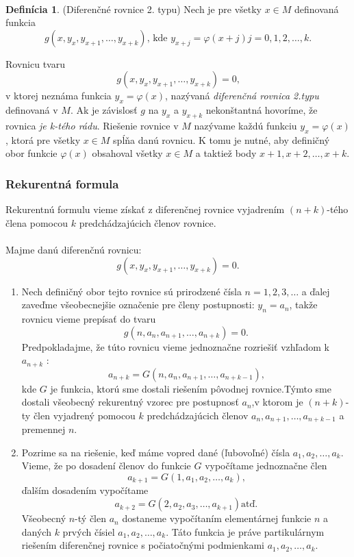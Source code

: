 \documentclass[a4paper,10pt]{article}
\theoremstyle{plain}
\theoremstyle{definition}
\newtheorem{defin}[thm]{Definícia}
\begin{document}
\paragraph{}
\begin{defin}
(Diferenčné rovnice 2. typu)
Nech je pre všetky $x \in M$
definovaná funkcia
$$g(x, y_{x}, y_{x+1}, \ldots, y_{x+k})\text{, kde }y_{x+j} = \varphi(x + j) j = 0, 1, 2, \ldots, k\text{.}$$
\end{defin}

Rovnicu tvaru
$$g(x, y_{x}, y_{x+1}, \ldots, y_{x+k}) = 0\text{,}$$
v ktorej neznáma funkcia $y_{x} = \varphi(x)$, nazývaná \textit{diferenčná rovnica 2.typu}
definovaná v $M$. Ak je závislosť $g$ na $y_{x}$ a $y_{x+k}$ nekonštantná hovoríme,
že rovnica \textit{je k-tého rádu}. Riešenie rovnice v $M$ nazývame každú funkciu
$y_{x} = \varphi(x)$, ktorá pre všetky $x \in M$  spĺňa danú rovnicu. K tomu je nutné,
aby definičný obor funkcie $\varphi(x)$ obsahoval všetky $x \in M$ a taktiež body
$x + 1, x + 2, \ldots, x + k$.
\newpage
\subsubsection{Rekurentná formula}
Rekurentnú formulu vieme získať z diferenčnej rovnice vyjadrením $(n+k)$-tého člena pomocou $k$ predchádzajúcich členov rovnice.

\paragraph{}
Majme danú diferenčnú rovnicu: $$g(x, y_{x}, y_{x+1}, \ldots, y_{x+k}) = 0\text{.}$$

\begin{enumerate}
	\item Nech definičný obor tejto rovnice sú prirodzené čísla $ n = 1, 2, 3, \ldots$ a
		ďalej zaveďme všeobecnejšie označenie pre členy postupnosti: $ y_{n} =  a_{n}$,
		takže rovnicu vieme prepísať do tvaru  $$g(n, a_{n}, a_{n+1}, \ldots, a_{n+k}) = 0\text{.}$$
		Predpokladajme, že túto rovnicu vieme jednoznačne rozriešiť vzhľadom k $ a_{n+k}$ :
		$$a_{n+k} = G(n, a_{n}, a_{n+1}, \ldots, a_{n+k-1})\text{,}$$
		kde $G$ je funkcia, ktorú sme dostali riešením pôvodnej rovnice.\linebreak[4]
		Týmto sme dostali všeobecný rekurentný vzorec pre postupnosť $a_{n}$,\linebreak[4] v ktorom je $(n+k)$-ty 				člen vyjadrený pomocou $k$ predchádzajúcich členov 
		$a_{n}, a_{n+1}, \ldots, a_{n+k-1}$ a premennej $n$.
	\item Pozrime sa na riešenie, keď máme vopred dané (ľubovoľné) čísla $ a_{1}, a_{2}, \ldots, a_{k}$.
		Vieme, že po dosadení členov do funkcie $G$ vypočítame jednoznačne člen
		$$a_{k+1} = G(1, a_{1}, a_{2}, \ldots, a_{k})\text{,}$$ ďalším dosadením vypočítame
		$$a_{k+2} = G(2, a_{2}, a_{3}, \ldots, a_{k+1})\text{atď.}$$
		Všeobecný $n$-tý člen $ a_{n} $ dostaneme vypočítaním elementárnej funkcie
		$n$ a daných $k$ prvých čísiel $ a_{1}, a_{2}, \ldots, a_{k}$. Táto funkcia je práve partikulárnym riešením 				diferenčnej rovnice s počiatočnými podmienkami $ a_{1}, a_{2}, \ldots, a_{k}$.	
\end{enumerate}
\end{document}
